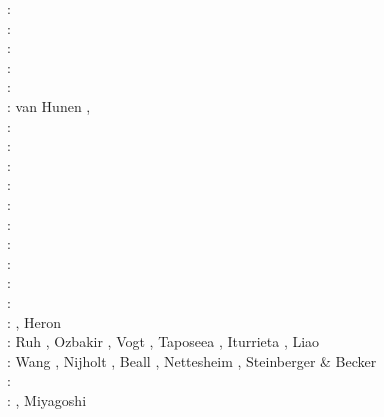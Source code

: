 \begin{scriptsize}
\twothousand: \cite{hanl00}\cite{labp00}\cite{lemm00}\cite{gumm00}\cite{lemo00}\cite{pepo00}\cite{scys00b}\\
\twothousandone: \cite{homo01}\cite{beoc01}\cite{kapo01}\\
\twothousandtwo: \cite{labu02}\cite{coli02}\cite{bast02}\cite{gedh02}\cite{kilg02}\\
\twothousandthree: \cite{wipo03}\cite{wabu03}\cite{geur03}\cite{upke03}\cite{vamf03}\cite{bupf03}\cite{lemm03}\cite{onmo03}\\
\twothousandfour: \cite{tibb04}\cite{gewi04}\cite{colm04}\cite{pybe04}\\
\twothousandfive: van Hunen \etal \cite{vazs05}, \cite{hagu05}\cite{wiwg05}\cite{mcjp05}\\
\twothousandsix: \cite{bube06}\cite{basv06}\cite{kasc06}\cite{fuwb06}\cite{colm06}\cite{pabs06}\cite{crnp06} \cite{sahm06}\\
\twothousandseven: \cite{afrf07}\cite{kore07}\cite{gewm07}\cite{jabn07}\\
\twothousandeight: \cite{affr08}\cite{tibb08}\cite{hapo08}\cite{busc08}\cite{clbz08}\cite{chlg08}
      \cite{kasb08}\cite{fabs08}\cite{chgu08}\cite{buit08}\cite{onlg08}\\
\twothousandnine: \cite{bupb09}\cite{plmg09}\cite{rigo09}\cite{bubg09}\cite{coco09}\\
\twothousandten: \cite{hamo10}\cite{fasm10}\cite{grpy10}\cite{vago10}\cite{plmf10}\cite{spgs10a}\cite{pygp10}
      \cite{jabw10}\\
\twothousandeleven: \cite{rera11}\cite{chss11}\\
\twothousandtwelve: \cite{wagw12}\cite{vacl12}\cite{buit12}\cite{kogp12}\cite{gohg12}\cite{trub12}\\
\twothousandthirteen: \cite{wazh13}\cite{krcu13}\cite{frbm13}\cite{wagw13}\cite{duyp13}\cite{rugb13} \cite{scdg13}\\
\twothousandfourteen: \cite{kava14}\cite{dusp14}\cite{wavp14}\cite{whbb14}\cite{scml14}
      \cite{mals14}\cite{gupm14}\cite{gahs14}\cite{mutg14}\\
\twothousandfifteen: \cite{wavp15}\cite{thkp15}\cite{mags15}\cite{duys15}\cite{dusp15}\\
\twothousandsixteen: \cite{wahz16}, Heron \etal \cite{heps16}\\
\twothousandseventeen: Ruh \etal \cite{rugb17}, Ozbakir \etal \cite{ozgw17},
                       Vogt \etal \cite{vomc17}, Taposeea \etal \cite{taac17}, 
                       Iturrieta \etal \cite{ithc17}, Liao \etal \cite{liwg17}\\
\twothousandeighteen: Wang \etal \cite{wavp18}, Nijholt \etal \cite{nigw18}, 
                      Beall \etal \cite{bemc18}, Nettesheim \etal \cite{neew18}, 
                      Steinberger \& Becker \cite{stbe18}\\
\twothousandnineteen: \cite{koen19}\cite{kipd19}\cite{crcm19}\cite{pedm19}\cite{mazz19}\cite{chch19}\\
\twothousandtwenty: \cite{yamq20}, Miyagoshi \etal \cite{miko20}
\end{scriptsize}


